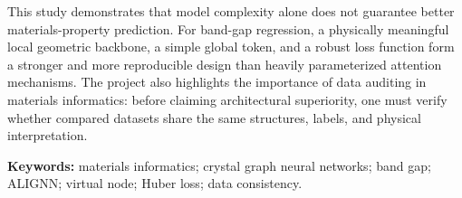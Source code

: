 \documentclass[11pt,a4paper]{article}
\begin{document}
This study demonstrates that model complexity alone does not guarantee better materials-property prediction. For band-gap regression, a physically meaningful local geometric backbone, a simple global token, and a robust loss function form a stronger and more reproducible design than heavily parameterized attention mechanisms. The project also highlights the importance of data auditing in materials informatics: before claiming architectural superiority, one must verify whether compared datasets share the same structures, labels, and physical interpretation.

\textbf{Keywords:} materials informatics; crystal graph neural networks; band gap; ALIGNN; virtual node; Huber loss; data consistency.
\end{document}
